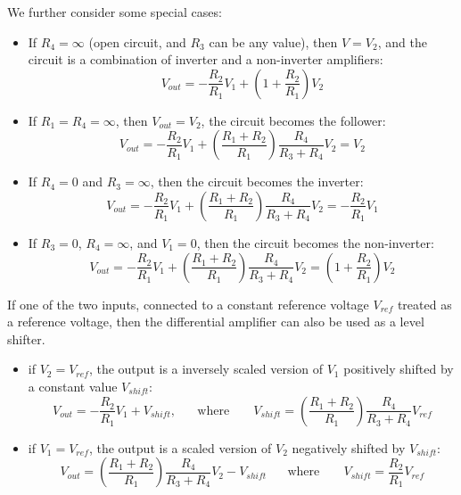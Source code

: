 \documentclass{article}
\begin{document}
\begin{itemize}
    
  We further consider some special cases:
  \begin{itemize}
  \item If $R_4=\infty$ (open circuit, and $R_3$ can be any value), then $V=V_2$,
    and the circuit is a combination of inverter and a non-inverter amplifiers:
    \begin{equation}
    V_{out}=-\frac{R_2}{R_1}V_1+\left(1+\frac{R_2}{R_1}\right)V_2 
    \end{equation}
  \item If $R_1=R_4=\infty$, then $V_{out}=V_2$, the circuit becomes the 
    follower:
    \begin{equation}
    V_{out}=-\frac{R_2}{R_1}V_1+\left(\frac{R_1+R_2}{R_1}\right)\frac{R_4}{R_3+R_4}V_2 
    =V_2
    \end{equation}
  \item If $R_4=0$ and $R_3=\infty$, then the circuit becomes the inverter:
    \begin{equation} 
    V_{out}=-\frac{R_2}{R_1}V_1+\left(\frac{R_1+R_2}{R_1}\right)\frac{R_4}{R_3+R_4}V_2 
    =-\frac{R_2}{R_1} V_1
    \end{equation}
  \item If $R_3=0$, $R_4=\infty$, and $V_1=0$, then the circuit becomes the 
    non-inverter:
    \begin{equation}
    V_{out}=-\frac{R_2}{R_1}V_1+\left(\frac{R_1+R_2}{R_1}\right)\frac{R_4}{R_3+R_4}V_2 
    =\left(1+\frac{R_2}{R_1}\right)V_2 
    \end{equation}
  \end{itemize}

  If one of the two inputs, connected to a constant reference voltage 
  $V_{ref}$ treated as a reference voltage, then the differential amplifier
  can also be used as a level shifter. 
  \begin{itemize}
  \item if $V_2=V_{ref}$, the output is a inversely scaled version of $V_1$ 
    positively shifted by a constant value $V_{shift}$:
    \begin{equation}
    V_{out}=-\frac{R_2}{R_1}V_1+V_{shift},
    \;\;\;\;\;\;\mbox{where}\;\;\;\;\;\;\;
    V_{shift}=\left(\frac{R_1+R_2}{R_1}\right)\frac{R_4}{R_3+R_4}V_{ref} 
    \end{equation}
  \item if $V_1=V_{ref}$, the output is a scaled version of $V_2$ 
    negatively shifted by $V_{shift}$:
    \begin{equation}
    V_{out}=\left(\frac{R_1+R_2}{R_1}\right)\frac{R_4}{R_3+R_4}V_2 
    -V_{shift}
    \;\;\;\;\;\;\mbox{where}\;\;\;\;\;\;\;
    V_{shift}=\frac{R_2}{R_1}V_{ref}
    \end{equation}
  \end{itemize}



\end{itemize}
\end{document}
